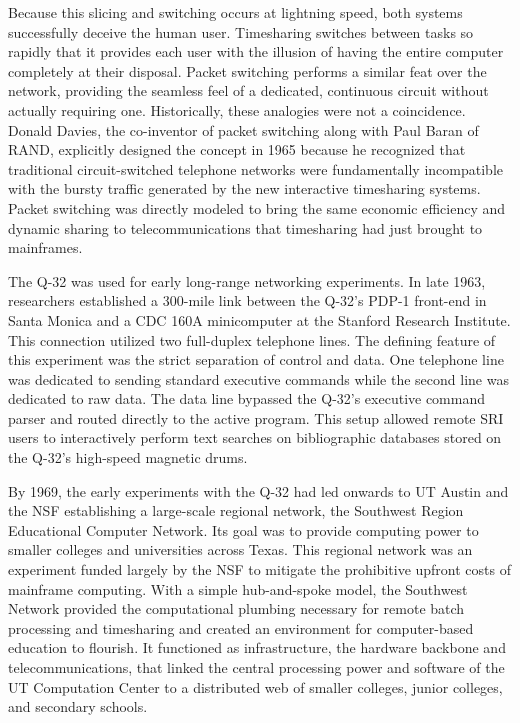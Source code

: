 Because this slicing and switching occurs at lightning speed, both systems successfully deceive the human user. Timesharing switches between tasks so rapidly that it provides each user with the illusion of having the entire computer completely at their disposal. Packet switching performs a similar feat over the network, providing the seamless feel of a dedicated, continuous circuit without actually requiring one. Historically, these analogies were not a coincidence. Donald Davies, the co-inventor of packet switching along with Paul Baran of RAND, explicitly designed the concept in 1965 because he recognized that traditional circuit-switched telephone networks were fundamentally incompatible with the bursty traffic generated by the new interactive timesharing systems. Packet switching was directly modeled to bring the same economic efficiency and dynamic sharing to telecommunications that timesharing had just brought to mainframes.

The Q-32 was used for early long-range networking experiments. In late 1963, researchers established a 300-mile link between the Q-32’s PDP-1 front-end in Santa Monica and a CDC 160A minicomputer at the Stanford Research Institute. This connection utilized two full-duplex telephone lines. The defining feature of this experiment was the strict separation of control and data. One telephone line was dedicated to sending standard executive commands while the second line was dedicated to raw data. The data line bypassed the Q-32's executive command parser and routed directly to the active program. This setup allowed remote SRI users to interactively perform text searches on bibliographic databases stored on the Q-32's high-speed magnetic drums.

By 1969, the early experiments with the Q-32 had led onwards to UT Austin and the NSF establishing a large-scale regional network, the Southwest Region Educational Computer Network. Its goal was to provide computing power to smaller colleges and universities across Texas. This regional network was an experiment funded largely by the NSF to mitigate the prohibitive upfront costs of mainframe computing. With a simple hub-and-spoke model, the Southwest Network provided the computational plumbing necessary for remote batch processing and timesharing and created an environment for computer-based education to flourish. It functioned as infrastructure, the hardware backbone and telecommunications, that linked the central processing power and software of the UT Computation Center to a distributed web of smaller colleges, junior colleges, and secondary schools. 

